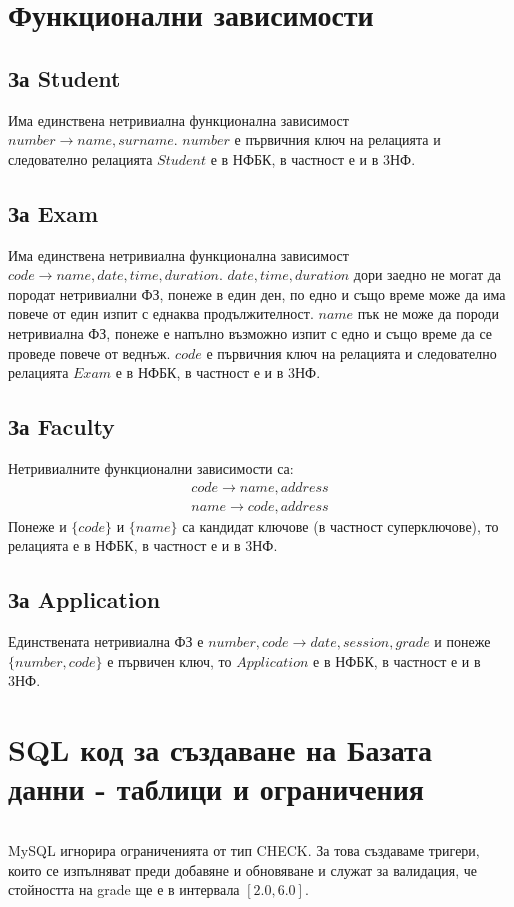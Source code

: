 \documentclass[a4paper, 12pt, x11names]{article}
\begin{document}
\section{Функционални зависимости}
\subsection{За Student}
Има единствена нетривиална функционална зависимост \(number \to name, surname\).
\(number\) е първичния ключ на релацията и следователно релацията \(Student\) е в НФБК, в частност е и в 3НФ.
\subsection{За Exam}
Има единствена нетривиална функционална зависимост \(code \to name, date, time, duration\).
\(date, time, duration\) дори заедно не могат да породат нетривиални ФЗ, понеже в един ден, по едно и също време може да има повече от един изпит с еднаква продължителност.
\(name\) пък не може да породи нетривиална ФЗ, понеже е напълно възможно изпит с едно и също време да се проведе повече от веднъж.
\(code\) е първичния ключ на релацията и следователно релацията \(Exam\) е в НФБК, в частност е и в 3НФ.
\subsection{За Faculty}
Нетривиалните функционални зависимости са:
\begin{align*}
    code \to name, address \\
    name \to code, address
\end{align*}
Понеже и \(\{code\}\) и \(\{name\}\) са кандидат ключове (в частност суперключове), то релацията е в НФБК, в частност е и в 3НФ.
\subsection{За Application}
Единствената нетривиална ФЗ е \(number, code \to date, session, grade\)
и понеже \(\{number, code\}\) е първичен ключ, то \(Application\) е в НФБК, в частност е и в 3НФ.
\section{SQL код за създаване на Базата данни - таблици и ограничения}
\inputminted{sql}{create.sql}
MySQL игнорира ограниченията от тип CHECK.
За това създаваме тригери, които се изпълняват преди добавяне и обновяване
и служат за валидация, че стойността на grade ще е в интервала \([2.0, 6.0]\).
\end{document}

